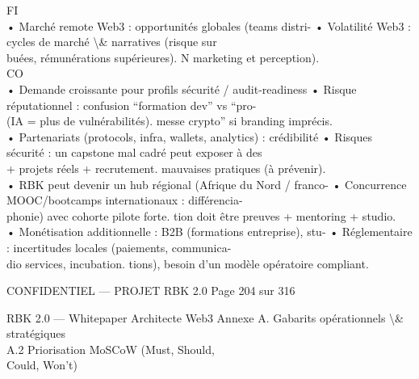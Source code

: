 FI\\
• Marché remote Web3 : opportunités globales (teams distri-           • Volatilité Web3 : cycles de marché \textbackslash{}& narratives (risque sur\\
buées, rémunérations supérieures).              N                     marketing et perception).\\
CO\\
• Demande croissante pour profils sécurité / audit-readiness          • Risque réputationnel : confusion “formation dev” vs “pro-\\
(IA = plus de vulnérabilités).                                        messe crypto” si branding imprécis.\\
• Partenariats (protocols, infra, wallets, analytics) : crédibilité   • Risques sécurité : un capstone mal cadré peut exposer à des\\
+ projets réels + recrutement.                                        mauvaises pratiques (à prévenir).\\
• RBK peut devenir un hub régional (Afrique du Nord / franco-         • Concurrence MOOC/bootcamps internationaux : différencia-\\
phonie) avec cohorte pilote forte.                                    tion doit être preuves + mentoring + studio.\\
• Monétisation additionnelle : B2B (formations entreprise), stu-      • Réglementaire : incertitudes locales (paiements, communica-\\
dio services, incubation.                                             tions), besoin d’un modèle opératoire compliant.\\
\vspace{0.5em}
\vspace{0.5em}
\vspace{0.5em}
\vspace{0.5em}
\begin{confidential}CONFIDENTIEL — PROJET RBK 2.0                                  Page 204 sur 316\end{confidential}
RBK 2.0 — Whitepaper Architecte Web3                                                                Annexe A. Gabarits opérationnels \textbackslash{}& stratégiques\\
\vspace{0.5em}
\vspace{0.5em}
\vspace{0.5em}
A.2     Priorisation MoSCoW (Must, Should,\\
Could, Won’t)\\

